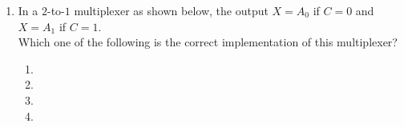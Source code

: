 \documentclass[journal,12pt,twocolumn]{IEEEtran}
\theoremstyle{remark}
\begin{document}
\begin{enumerate}[start=1]
\item In a $2$-to-$1$ multiplexer as shown below, the output $X=A_0$ if $C=0$ and $X=A_1$ if $C=1$.\\

Which one of the following is the correct implementation of this multiplexer?
\begin{enumerate}
    \item 


\item 


\item 




\item 






\end{enumerate}

                                        


 
\end{enumerate}
\end{document}
